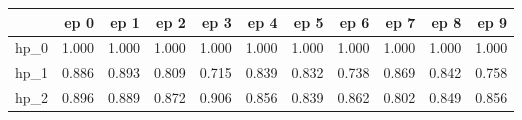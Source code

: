 \begin{tabular}{lrrrrrrrrrr}
\toprule
{} &   ep 0 &   ep 1 &   ep 2 &   ep 3 &   ep 4 &   ep 5 &   ep 6 &   ep 7 &   ep 8 &   ep 9 \\
\midrule
hp\_0 &  1.000 &  1.000 &  1.000 &  1.000 &  1.000 &  1.000 &  1.000 &  1.000 &  1.000 &  1.000 \\
hp\_1 &  0.886 &  0.893 &  0.809 &  0.715 &  0.839 &  0.832 &  0.738 &  0.869 &  0.842 &  0.758 \\
hp\_2 &  0.896 &  0.889 &  0.872 &  0.906 &  0.856 &  0.839 &  0.862 &  0.802 &  0.849 &  0.856 \\
\bottomrule
\end{tabular}
